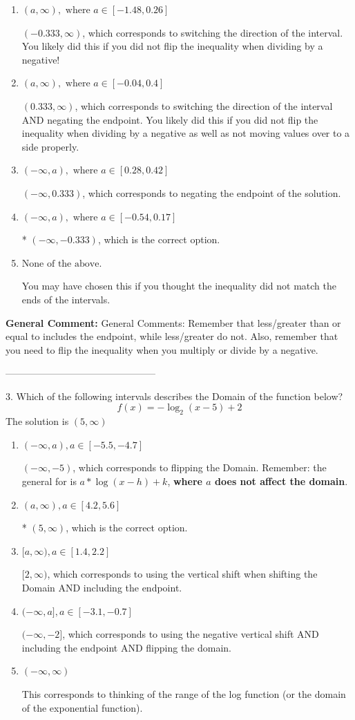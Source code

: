 \documentclass{extbook}[14pt]
\begin{document}
\begin{enumerate}[label=\Alph*.] 
\item $ (a, \infty), \text{ where } a \in [-1.48, 0.26] $ 

  $(-0.333, \infty)$, which corresponds to switching the direction of the interval. You likely did this if you did not flip the inequality when dividing by a negative! 
\item $ (a, \infty), \text{ where } a \in [-0.04, 0.4] $ 

  $(0.333, \infty)$, which corresponds to switching the direction of the interval AND negating the endpoint. You likely did this if you did not flip the inequality when dividing by a negative as well as not moving values over to a side properly. 
\item $ (-\infty, a), \text{ where } a \in [0.28, 0.42] $ 

  $(-\infty, 0.333)$, which corresponds to negating the endpoint of the solution. 
\item $ (-\infty, a), \text{ where } a \in [-0.54, 0.17] $ 

 * $(-\infty, -0.333)$, which is the correct option. 
\item $ \text{None of the above}. $ 

 You may have chosen this if you thought the inequality did not match the ends of the intervals. 
\end{enumerate} 
 
\textbf{General Comment:} General Comments: Remember that less/greater than or equal to includes the endpoint, while less/greater do not. Also, remember that you need to flip the inequality when you multiply or divide by a negative. 

-----------------------------------------------

3. Which of the following intervals describes the Domain of the function below?
\[ f(x) = -\log_2{(x-5)}+2 \] 
The solution is $ (5, \infty) $ 

\begin{enumerate}[label=\Alph*.] 
\item $ (-\infty, a), a \in [-5.5, -4.7] $ 

 $(-\infty, -5)$, which corresponds to flipping the Domain. Remember: the general for is $a*\log(x-h)+k$, \textbf{where $a$ does not affect the domain}. 
\item $ (a, \infty), a \in [4.2, 5.6] $ 

 * $(5, \infty)$, which is the correct option. 
\item $ [a, \infty), a \in [1.4, 2.2] $ 

 $[2, \infty)$, which corresponds to using the vertical shift when shifting the Domain AND including the endpoint. 
\item $ (-\infty, a], a \in [-3.1, -0.7] $ 

 $(-\infty, -2]$, which corresponds to using the negative vertical shift AND including the endpoint AND flipping the domain. 
\item $ (-\infty, \infty) $ 

 This corresponds to thinking of the range of the log function (or the domain of the exponential function). 
\end{enumerate} 
 
\end{document}
